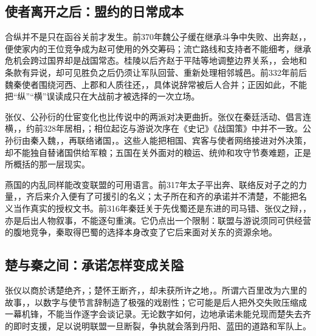 \subsection{使者离开之后：盟约的日常成本}

合纵并不是只在函谷关前才发生。前370年魏公子缓在继承斗争中失败、出奔赵，，便使家内的王位竞争成为赵可使用的外交筹码；流亡路线和支持者不能细考，继承危机会跨过国界却是战国常态。桂陵以后齐赵于平陆等地调整边界关系，，会地和条款有异说，却可见胜负之后仍须让军队回营、重新处理相邻城邑。前332年前后魏秦使者围绕河西、上郡和人质往还，，具体说辞常被后人合并；正因如此，不能把“纵”“横”误读成只在大战前才被选择的一次立场。

张仪、公孙衍的仕宦变化也比传说中的两派对决更曲折。张仪在秦廷活动、倡言连横，，约前328年居相，；相位起讫与游说次序在《史记》《战国策》中并不一致。公孙衍由秦入魏，，再联络诸国，。这些人能把相国、宾客与使者网络接进对外决策，却不能独自替诸国供给军粮；五国在关外面对的粮运、统帅和攻守节奏难题，正是所概括的那一层现实。

燕国的内乱同样能改变联盟的可用语言。前317年太子平出奔、联络反对子之的力量，，齐后来介入便有了可援引的名义；太子所在和齐的承诺并不清楚，不能把名义当作真实的授权文书。前316年秦廷关于先伐蜀还是东进的司马错、张仪之辩，，亦是后出人物叙事，不能逐句重演。它仍点出一个限制：联盟与游说须同可供经营的腹地竞争，秦取得巴蜀的选择本身改变了它后来面对关东的资源余地。

\subsection{楚与秦之间：承诺怎样变成关隘}

张仪以商於诱楚绝齐，；楚怀王断齐，，却未获所许之地，。所谓六百里改为六里的故事，，以数字与使节言辞制造了极强的戏剧性；它可能是后人把外交失败压缩成一幕机锋，不能当作逐字会谈记录。无论数字如何，边地承诺未能兑现而楚失去齐的即时支援，足以说明联盟一旦断裂，争执就会落到丹阳、蓝田的道路和军队上。

